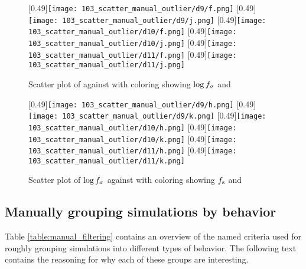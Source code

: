 \begin{figure}
\centering
{}[0.49\linewidth]{\texttt{[image: 103\_scatter\_manual\_outlier/d9/f.png]}}
[0.49\linewidth]{\texttt{[image: 103\_scatter\_manual\_outlier/d9/j.png]}}
[0.49\linewidth]{\texttt{[image: 103\_scatter\_manual\_outlier/d10/f.png]}}
[0.49\linewidth]{\texttt{[image: 103\_scatter\_manual\_outlier/d10/j.png]}}
[0.49\linewidth]{\texttt{[image: 103\_scatter\_manual\_outlier/d11/f.png]}}
[0.49\linewidth]{\texttt{[image: 103\_scatter\_manual\_outlier/d11/j.png]}}
\caption{Scatter plot of \roundstable against \timetoreachnewfundamental with coloring showing $\log f_\sigma$ and \overshoot}
\label{figure:scatter_fitness_inliers_a}
\end{figure}

\begin{figure}
\centering
{}[0.49\linewidth]{\texttt{[image: 103\_scatter\_manual\_outlier/d9/h.png]}}
[0.49\linewidth]{\texttt{[image: 103\_scatter\_manual\_outlier/d9/k.png]}}
[0.49\linewidth]{\texttt{[image: 103\_scatter\_manual\_outlier/d10/h.png]}}
[0.49\linewidth]{\texttt{[image: 103\_scatter\_manual\_outlier/d10/k.png]}}
[0.49\linewidth]{\texttt{[image: 103\_scatter\_manual\_outlier/d11/h.png]}}
[0.49\linewidth]{\texttt{[image: 103\_scatter\_manual\_outlier/d11/k.png]}}
\caption{Scatter plot of $\log f_\sigma$ against \timetoreachnewfundamental with coloring showing $f_\text{s}$ and \overshoot}
\label{figure:d9_scatter_fitness_inliers_b}
\end{figure}

\subsection{Manually grouping simulations by behavior}\label{section:manually_grouping_simulations}
Table \ref{table:manual_filtering} contains an overview of the named criteria used for roughly grouping simulations into different types of behavior. The following text contains the reasoning for why each of these groups are interesting.

